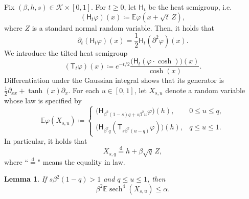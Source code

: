 \documentclass[11pt]{article}
\newtheorem{lemma}[theorem]{Lemma}
\numberwithin{equation}{section}
\newcommand{\E}{\mathbb{E}}
\newcommand{\1}{\mathbf 1}
\newcommand{\sech}{\operatorname{sech}}
\newcommand{\cK}{\mathcal K}
\begin{document}
Fix $(\beta,h,s)\in\cK\times[0,1]$.
For $t\ge0$, let $\mathsf H_t$ be the heat semigroup, i.e. 
\[
 (\mathsf H_t\varphi)(x)\coloneqq\E\varphi(x+\sqrt t\,Z),
\]
where $Z$ is a standard normal random variable.
Then, it holds that
\begin{equation}\label{eq:genH}
\partial _t (\mathsf H_t\varphi)(x) = \frac{1}{2} \mathsf H_t (\partial ^2 \varphi)(x) .
\end{equation}
We introduce the tilted heat semigroup
\begin{equation}
 (\mathsf T_t\varphi)(x)
 \coloneqq e^{-t/2}
 \frac{\bigl(\mathsf H_t
   (\varphi \cdot \cosh )\bigr)(x)}{\cosh(x)}.
 \label{eq:tiltedsemigroup}
\end{equation}
Differentiation under the Gaussian integral shows that its generator is
$\frac12\partial_{xx}+\tanh(x)\partial_x$.  For each $u\in[0,1]$,
let $X_{s,u}$ denote a random variable whose law is specified by
\begin{equation}
 \E\varphi(X_{s,u})
 \coloneqq
 \begin{cases}
  \bigl(\mathsf H_{\beta^2(1-s)q+s\beta^2u}\varphi\bigr)(h),
      &0\le u\le q,\\[1mm]
  \bigl(\mathsf H_{\beta^2q}
      (\mathsf T_{s\beta^2(u-q)}\varphi)\bigr)(h),
      &q\le u\le1.
 \end{cases}
 \label{eq:localfieldlaw}
\end{equation}
In particular, it holds that
\begin{equation}\label{eq:Xsq}
X_{s,q}\stackrel{\mathrm d}=h+\beta\sqrt q\,Z,
\end{equation}
where ``$\stackrel{\mathrm d}=$" means the equality in law.

\begin{lemma}
\label{lem:uppercomparison}
If $s\beta^2(1-q)>1$ and $q\le u\le1$, then
\begin{equation}
 \beta^2\E\sech^4(X_{s,u})\le\alpha.
 \label{eq:uppercomparison}
\end{equation}
\end{lemma}
\end{document}
